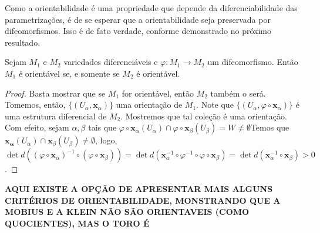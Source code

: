 Como a orientabilidade é uma propriedade que depende da diferenciabilidade das parametrizações, é de se esperar que a orientabilidade seja preservada por difeomorfismos. Isso é de fato verdade, conforme demonstrado no próximo resultado.
\begin{proposition}
    \label{loc:prop_6_:_difeomorfismos_preservam_orientabilidade.}
    Sejam $M_{1}$ e $M_{2}$ variedades diferenciáveis e $\varphi:M_{1}\to M_{2}$ um difeomorfismo. Então $M_{1}$ é orientável se, e somente se $M_{2}$ é orientável.
    \begin{proof}

        Basta mostrar que se $M_{1}$ for orientável, então $M_{2}$ também o será. Tomemos, então, $\{ (U_{\alpha}, \mathbf{x}_{\alpha}) \}$ uma orientação de $M_{1}$. Note que $\{ (U_{\alpha}, \varphi \circ \mathbf{x}_{\alpha}) \}$ é uma estrutura diferencial de $M_{2}$. Mostremos que tal coleção é uma orientação. Com efeito, sejam $\alpha, \beta$ tais que $\varphi \circ \mathbf{x}_{\alpha}(U_{\alpha})\cap \varphi \circ \mathbf{x}_{\beta}(U_{\beta})=W \neq  \emptyset$Temos que $\mathbf{x_{\alpha}}(U_{\alpha}) \cap \mathbf{x}_{\beta}(U_{\beta})\neq \emptyset$, logo, $\det d((\varphi \circ \mathbf{x}_{\alpha})^{-1} \circ(\varphi \circ \mathbf{x}_{\beta}))=\det d(\mathbf{x}_{\alpha}^{-1} \circ \varphi ^{-1} \circ \varphi \circ \mathbf{x}_{\beta})=\det d(\mathbf{x}_{\alpha}^{-1} \circ \mathbf{x}_{\beta})>0$.
    \end{proof}
\end{proposition}
\textbf{AQUI EXISTE A OPÇÃO DE APRESENTAR MAIS ALGUNS CRITÉRIOS DE ORIENTABILIDADE, MONSTRANDO QUE A MOBIUS E A KLEIN NÃO SÃO ORIENTAVEIS (COMO QUOCIENTES), MAS O TORO É}
